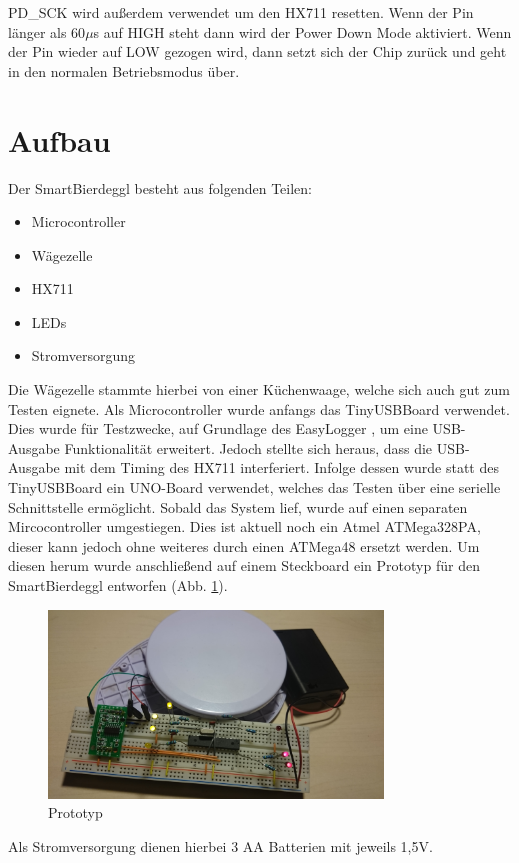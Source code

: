 \documentclass[12pt,journal]{IEEEtran}
\begin{document}
PD\_SCK wird außerdem verwendet um den HX711 resetten. Wenn der Pin länger als 60$\mu$s auf HIGH
steht dann wird der Power Down Mode aktiviert. Wenn der Pin wieder auf LOW gezogen wird,
dann setzt sich der Chip zurück und geht in den normalen Betriebsmodus über.

\section{Aufbau}
Der SmartBierdeggl besteht aus folgenden Teilen:
\begin{itemize}
\item Microcontroller
\item Wägezelle
\item HX711
\item LEDs
\item Stromversorgung
\end{itemize}
Die Wägezelle stammte hierbei von einer Küchenwaage, welche sich auch gut zum Testen eignete.
Als Microcontroller wurde anfangs das TinyUSBBoard \cite{tinyusb} verwendet.
Dies wurde für Testzwecke, auf Grundlage des EasyLogger \cite{easylogger}, um eine USB-Ausgabe Funktionalität erweitert.
Jedoch stellte sich heraus, dass die USB-Ausgabe mit dem Timing des HX711 interferiert.
Infolge dessen wurde statt des TinyUSBBoard  ein UNO-Board verwendet, welches das Testen über eine serielle Schnittstelle ermöglicht.
Sobald das System lief, wurde auf einen separaten Mircocontroller umgestiegen.
Dies ist aktuell noch ein Atmel ATMega328PA, dieser kann jedoch ohne weiteres durch einen ATMega48 ersetzt werden.
Um diesen herum wurde anschließend auf einem Steckboard ein Prototyp für den SmartBierdeggl entworfen (Abb. \ref{fig_prototyp}).
\begin{figure}[!h]
  \centering
    \includegraphics[width=3.5in]{images/prototyp.jpg}
    \caption{Prototyp}
  \label{fig_prototyp}
\end{figure}
Als Stromversorgung dienen hierbei 3 AA Batterien mit jeweils 1,5V.
\end{document}
